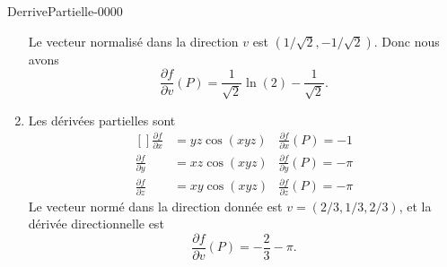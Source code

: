 \begin{corrige}{DerrivePartielle-0000}
\begin{enumerate}
			Le vecteur normalisé dans la direction $v$ est $(1/\sqrt{2},-1/\sqrt{2})$. Donc nous avons
			\begin{equation}
				\frac{ \partial f }{ \partial v }(P)=\frac{1}{ \sqrt{2} }\ln(2)-\frac{1}{ \sqrt{2} }.
			\end{equation}
		\item
			Les dérivées partielles sont
			\begin{equation}
				\begin{aligned}[]
					\frac{ \partial f }{ \partial x }&=yz\cos(xyz)&\frac{ \partial f }{ \partial x }(P)=-1\\
					\frac{ \partial f }{ \partial y }&=xz\cos(xyz)&\frac{ \partial f }{ \partial y }(P)=-\pi\\
					\frac{ \partial f }{ \partial z }&=xy\cos(xyz)&\frac{ \partial f }{ \partial z }(P)=-\pi
				\end{aligned}
			\end{equation}
			Le vecteur normé dans la direction donnée est $v=(2/3,1/3,2/3)$, et la dérivée directionnelle est
			\begin{equation}
				\frac{ \partial f }{ \partial v }(P)=-\frac{ 2 }{ 3 }-\pi.
			\end{equation}
			

	\end{enumerate}
	

\end{corrige}

